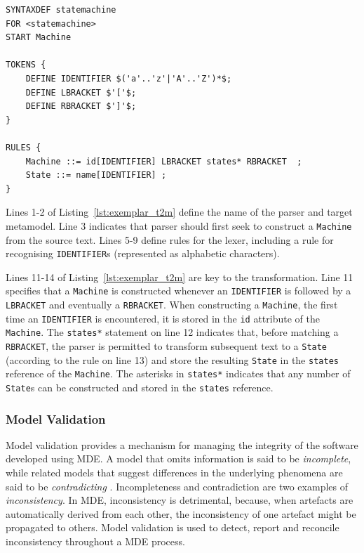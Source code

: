 \begin{lstlisting}[caption=Exemplar T2M transformation in EMFtext, label=lst:exemplar_t2m, language=EMFtext]
SYNTAXDEF statemachine
FOR <statemachine>
START Machine

TOKENS {
	DEFINE IDENTIFIER $('a'..'z'|'A'..'Z')*$;
	DEFINE LBRACKET $'['$;
	DEFINE RBRACKET $']'$;
}

RULES {
	Machine ::= id[IDENTIFIER] LBRACKET states* RBRACKET  ;
	State ::= name[IDENTIFIER] ;
}
\end{lstlisting}

Lines 1-2 of Listing~\ref{lst:exemplar_t2m} define the name of the parser and target metamodel. Line 3 indicates that parser should first seek to construct a \texttt{Machine} from the source text. Lines 5-9 define rules for the lexer, including a rule for recognising \texttt{IDENTIFIER}s (represented as alphabetic characters).  

Lines 11-14 of Listing~\ref{lst:exemplar_t2m} are key to the transformation. Line 11 specifies that a \texttt{Machine} is constructed whenever an \texttt{IDENTIFIER} is followed by a \texttt{LBRACKET} and eventually a \texttt{RBRACKET}. When constructing a \texttt{Machine}, the first time an \texttt{IDENTIFIER} is encountered, it is stored in the \texttt{id} attribute of the \texttt{Machine}. The \texttt{states*} statement on line 12 indicates that, before matching a \texttt{RBRACKET}, the parser is permitted to transform subsequent text to a \texttt{State} (according to the rule on line 13) and store the resulting \texttt{State} in the \texttt{states} reference of the \texttt{Machine}. The asterisks in \texttt{states*} indicates that any number of \texttt{State}s can be constructed and stored in the \texttt{states} reference.

\subsubsection{Model Validation}
Model validation provides a mechanism for managing the integrity of the software developed using MDE. A model that omits information is said to be \emph{incomplete}, while related models that suggest differences in the underlying phenomena are said to be \emph{contradicting} \cite{kolovos09thesis}. Incompleteness and contradiction are two examples of \emph{inconsistency}. In MDE, inconsistency is detrimental, because, when artefacts are automatically derived from each other, the inconsistency of one artefact might be propagated to others. Model validation is used to detect, report and reconcile inconsistency throughout a MDE process.

